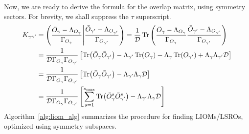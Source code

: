 Now, we are ready to derive the formula for the overlap matrix, using symmetry sectors. For brevity,
we shall suppress the \(\tau\) superscript.
\begin{align}
  K_{\gamma\gamma^{\prime}} & = \left(\frac{\bar{O}_{\gamma} - \Lambda_{O_{\gamma}}}{\Gamma_{O_{\gamma}}} \middle| \frac{\bar{O}_{\gamma^{\prime}} - \Lambda_{O_{\gamma^{\prime}}}}{\Gamma_{O_{\gamma^{\prime}}}}\right)
  = \frac{1}{\mathcal{D}} \Tr\left(\frac{\bar{O}_{\gamma} - \Lambda_{O_{\gamma}}}{\Gamma_{O_{\gamma}}}\frac{\bar{O}_{\gamma^{\prime}} - \Lambda_{O_{\gamma^{\prime}}}}{\Gamma_{O_{\gamma^{\prime}}}}\right) \nonumber                                                                                                         \\
                            & = \frac{1}{\mathcal{D} \Gamma_{O_{\gamma}}\Gamma_{O_{\gamma^{\prime}}}} \left[\Tr(\bar{O}_{\gamma} \bar{O}_{\gamma^{\prime}}) - \Lambda_{\gamma^{\prime}} \Tr(O_{\gamma}) - \Lambda_{\gamma} \Tr(O_{\gamma^{\prime}}) + \Lambda_{\gamma} \Lambda_{\gamma^{\prime}} \mathcal{D} \right]\nonumber \\
                            & = \frac{1}{\mathcal{D} \Gamma_{O_{\gamma}}\Gamma_{O_{\gamma^{\prime}}}} \left[\Tr(\bar{O}_{\gamma} \bar{O}_{\gamma^{\prime}}) - \Lambda_{\gamma^{\prime}} \Lambda_{\gamma} \mathcal{D} \right] \nonumber                                                                                        \\
                            & = \frac{1}{\mathcal{D} \Gamma_{O_{\gamma}}\Gamma_{O_{\gamma^{\prime}}}} \left[\sum_{s=1}^{s_{\text{max}}} \Tr(\bar{O}_{\gamma}^s \bar{O}_{\gamma^{\prime}}^s) - \Lambda_{\gamma^{\prime}} \Lambda_{\gamma} \mathcal{D} \right]
\end{align}
Algorithm~\ref{alg:liom_alg} summarizes the procedure for finding LIOMs/LSROs, optimized using symmetry subspaces.

